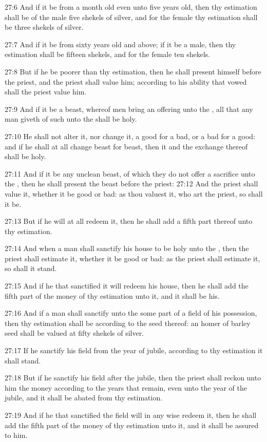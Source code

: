 27:6 And if it be from a month old even unto five years old, then thy estimation shall be of the male five shekels of silver, and for the female thy estimation shall be three shekels of silver.

27:7 And if it be from sixty years old and above; if it be a male, then thy estimation shall be fifteen shekels, and for the female ten shekels.

27:8 But if he be poorer than thy estimation, then he shall present himself before the priest, and the priest shall value him; according to his ability that vowed shall the priest value him.

27:9 And if it be a beast, whereof men bring an offering unto the \LORD, all that any man giveth of such unto the \LORD shall be holy.

27:10 He shall not alter it, nor change it, a good for a bad, or a bad for a good: and if he shall at all change beast for beast, then it and the exchange thereof shall be holy.

27:11 And if it be any unclean beast, of which they do not offer a sacrifice unto the \LORD, then he shall present the beast before the priest: 27:12 And the priest shall value it, whether it be good or bad: as thou valuest it, who art the priest, so shall it be.

27:13 But if he will at all redeem it, then he shall add a fifth part thereof unto thy estimation.

27:14 And when a man shall sanctify his house to be holy unto the \LORD, then the priest shall estimate it, whether it be good or bad: as the priest shall estimate it, so shall it stand.

27:15 And if he that sanctified it will redeem his house, then he shall add the fifth part of the money of thy estimation unto it, and it shall be his.

27:16 And if a man shall sanctify unto the \LORD some part of a field of his possession, then thy estimation shall be according to the seed thereof: an homer of barley seed shall be valued at fifty shekels of silver.

27:17 If he sanctify his field from the year of jubile, according to thy estimation it shall stand.

27:18 But if he sanctify his field after the jubile, then the priest shall reckon unto him the money according to the years that remain, even unto the year of the jubile, and it shall be abated from thy estimation.

27:19 And if he that sanctified the field will in any wise redeem it, then he shall add the fifth part of the money of thy estimation unto it, and it shall be assured to him.

